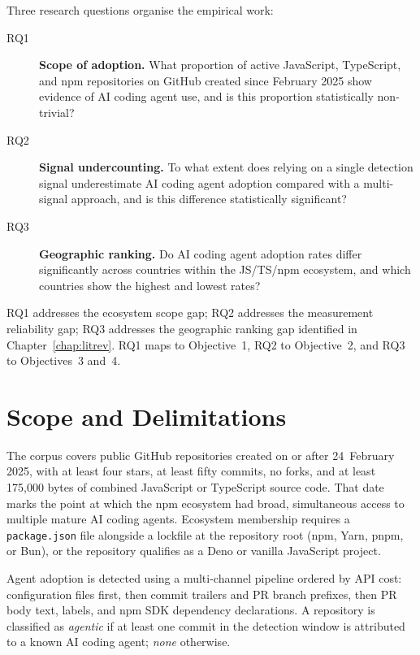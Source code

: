 Three research questions organise the empirical work:

\begin{description}
  \item[RQ1] \textbf{Scope of adoption.}
    What proportion of active JavaScript, TypeScript, and npm repositories on GitHub created since February 2025 show evidence of AI coding agent use, and is this proportion statistically non-trivial?

  \item[RQ2] \textbf{Signal undercounting.}
    To what extent does relying on a single detection signal underestimate AI coding agent adoption compared with a multi-signal approach, and is this difference statistically significant?

  \item[RQ3] \textbf{Geographic ranking.}
    Do AI coding agent adoption rates differ significantly across countries within the JS/TS/npm ecosystem, and which countries show the highest and lowest rates?

\end{description}

RQ1 addresses the ecosystem scope gap; RQ2 addresses the measurement reliability gap; RQ3 addresses the geographic ranking gap identified in Chapter~\ref{chap:litrev}. RQ1 maps to Objective~1, RQ2 to Objective~2, and RQ3 to Objectives~3 and~4.

\section{Scope and Delimitations}
\label{sec:intro:scope}

The corpus covers public GitHub repositories created on or after 24~February 2025, with at least four stars, at least fifty commits, no forks, and at least 175,000 bytes of combined JavaScript or TypeScript source code. That date marks the point at which the npm ecosystem had broad, simultaneous access to multiple mature AI coding agents. Ecosystem membership requires a \texttt{package.json} file alongside a lockfile at the repository root (npm, Yarn, pnpm, or Bun), or the repository qualifies as a Deno or vanilla JavaScript project.

Agent adoption is detected using a multi-channel pipeline ordered by API cost: configuration files first, then commit trailers and PR branch prefixes, then PR body text, labels, and npm SDK dependency declarations. A repository is classified as \emph{agentic} if at least one commit in the detection window is attributed to a known AI coding agent; \emph{none} otherwise.

